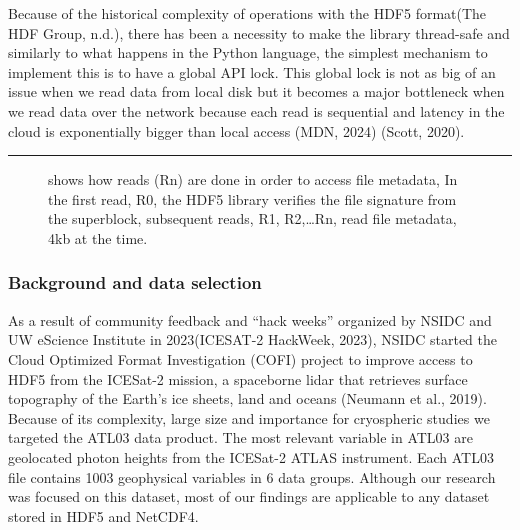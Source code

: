\documentclass[
]{agujournal2019}
\begin{document}
Because of the historical complexity of operations with the HDF5
format(The HDF Group, n.d.), there has been a necessity to make the
library thread-safe and similarly to what happens in the Python
language, the simplest mechanism to implement this is to have a global
API lock. This global lock is not as big of an issue when we read data
from local disk but it becomes a major bottleneck when we read data over
the network because each read is sequential and latency in the cloud is
exponentially bigger than local access (MDN, 2024) (Scott, 2020).

\begin{center}\rule{0.5\linewidth}{0.5pt}\end{center}

\begin{figure}


\caption{\label{fig-1}shows how reads (Rn) are done in order to access
file metadata, In the first read, R0, the HDF5 library verifies the file
signature from the superblock, subsequent reads, R1, R2,\ldots Rn, read
file metadata, 4kb at the time.}

\end{figure}%

\subsubsection{\texorpdfstring{\textbf{Background and data
selection}}{Background and data selection}}\label{background-and-data-selection}

As a result of community feedback and ``hack weeks'' organized by NSIDC
and UW eScience Institute in 2023(ICESAT-2 HackWeek, 2023), NSIDC
started the Cloud Optimized Format Investigation (COFI) project to
improve access to HDF5 from the ICESat-2 mission, a spaceborne lidar
that retrieves surface topography of the Earth's ice sheets, land and
oceans (Neumann et al., 2019). Because of its complexity, large size and
importance for cryospheric studies we targeted the ATL03 data product.
The most relevant variable in ATL03 are geolocated photon heights from
the ICESat-2 ATLAS instrument. Each ATL03 file contains 1003 geophysical
variables in 6 data groups. Although our research was focused on this
dataset, most of our findings are applicable to any dataset stored in
HDF5 and NetCDF4.
\end{document}
